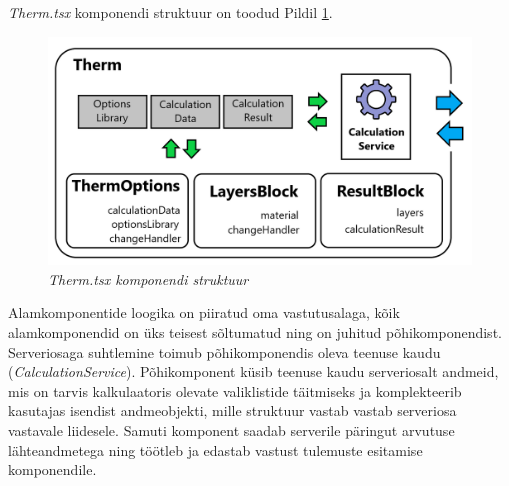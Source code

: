 \textit{Therm.tsx} komponendi struktuur on toodud Pildil \ref{fig:development_frontend_therm}.
\begin{figure}[ht]
    \centering
    \includegraphics[width=1\textwidth]{figures/development/frontend_term_structure.png}
    \caption[Kasutajaliidese komponendi \textit{Therm.tsx} struktuur]{\textit{Therm.tsx komponendi struktuur}}
    \label{fig:development_frontend_therm}
\end{figure}

Alamkomponentide loogika on piiratud oma vastutusalaga, kõik alamkomponendid on üks teisest sõltumatud ning on juhitud põhikomponendist. Serveriosaga suhtlemine toimub põhikomponendis
oleva teenuse kaudu (\textit{CalculationService}). Põhikomponent küsib teenuse kaudu serveriosalt andmeid, mis on tarvis kalkulaatoris olevate valiklistide täitmiseks ja komplekteerib
kasutajas isendist andmeobjekti, mille struktuur vastab vastab serveriosa vastavale liidesele. Samuti komponent saadab serverile päringut arvutuse lähteandmetega ning 
töötleb ja edastab vastust tulemuste esitamise komponendile.
